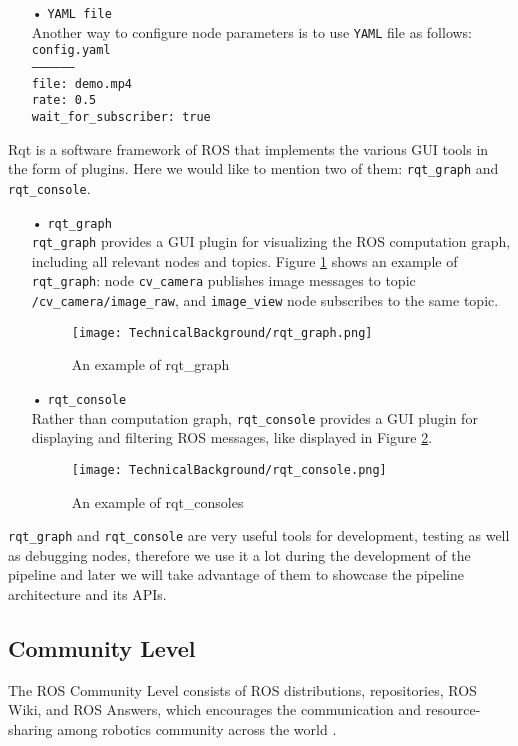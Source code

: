 \begin{description}[leftmargin=0in, labelindent=0pt]
{\begin{itemize}
\vspace{1em}
\item[•] \texttt{YAML file}{\\
Another way to configure node parameters is to use \texttt{YAML} file as follows:\\ 
\texttt{config.yaml} \\
\texttt{------------------} \\
\texttt{file: demo.mp4} \\
\texttt{rate: 0.5} \\
\texttt{wait\_for\_subscriber: true}
} 
\end{itemize}
}

\item[Rqt User Interface]{
Rqt is a software framework of ROS that implements the various GUI tools in the form of plugins. Here we would like to mention two of them: \texttt{rqt\_graph} and \texttt{rqt\_console}. 

\begin{itemize}
\item[•] \texttt{rqt\_graph} \\
\texttt{rqt\_graph} provides a GUI plugin for visualizing the ROS computation graph, including all relevant nodes and topics. Figure \ref{fig:rqt_graph} shows an example of \texttt{rqt\_graph}: node \texttt{cv\_camera} publishes image messages to topic \texttt{/cv\_camera/image\_raw}, and \texttt{image\_view} node subscribes to the same topic. 

\begin{figure}[H]
  \centering
  \texttt{[image: TechnicalBackground/rqt\_graph.png]}
  \caption{An example of rqt\_graph}
  \label{fig:rqt_graph}
\end{figure} 

\item[•] \texttt{rqt\_console} \\
Rather than computation graph, \texttt{rqt\_console} provides a GUI plugin for displaying and filtering ROS messages, like displayed in Figure \ref{fig:rqt_console}. 

\begin{figure}[H]
  \centering
  \texttt{[image: TechnicalBackground/rqt\_console.png]}
  \caption{An example of rqt\_consoles}
  \label{fig:rqt_console}
\end{figure}
\end{itemize}

\texttt{rqt\_graph} and \texttt{rqt\_console} are very useful tools for development, testing as well as debugging nodes, therefore we use it a lot during the development of the pipeline and later we will take advantage of them to showcase the pipeline architecture and its APIs.
}
\end{description}

\subsection{Community Level}
The ROS Community Level consists of ROS distributions, repositories, ROS Wiki, and ROS Answers, which encourages the communication and resource-sharing among robotics community across the world \cite{rosconcept}.

\let\cleardoublepage\clearpage

